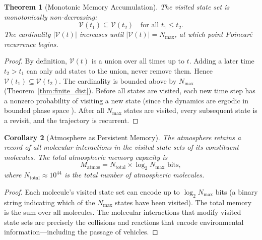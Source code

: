 \documentclass[11pt,twocolumn,a4paper]{article}
\theoremstyle{plain}
\newtheorem{theorem}{Theorem}[section]
\newtheorem{corollary}[theorem]{Corollary}
\theoremstyle{definition}
\theoremstyle{remark}
\newcommand{\Nmax}{N_{\mathrm{max}}}
\begin{document}
\begin{theorem}[Monotonic Memory Accumulation]
\label{thm:memory}
The visited state set is monotonically non-decreasing:
\begin{equation}
\mathcal{V}(t_1) \subseteq \mathcal{V}(t_2) \quad \text{for all } t_1 \leq t_2.
\label{eq:monotone}
\end{equation}
The cardinality $|\mathcal{V}(t)|$ increases until $|\mathcal{V}(t)| = \Nmax$, at which point Poincar\'e recurrence begins.
\end{theorem}

\begin{proof}
By definition, $\mathcal{V}(t)$ is a union over all times up to $t$. Adding a later time $t_2 > t_1$ can only add states to the union, never remove them. Hence $\mathcal{V}(t_1) \subseteq \mathcal{V}(t_2)$. The cardinality is bounded above by $\Nmax$ (Theorem~\ref{thm:finite_dist}). Before all states are visited, each new time step has a nonzero probability of visiting a new state (since the dynamics are ergodic in bounded phase space \cite{walters1982introduction}). After all $\Nmax$ states are visited, every subsequent state is a revisit, and the trajectory is recurrent.
\end{proof}

\begin{corollary}[Atmosphere as Persistent Memory]
\label{cor:atmos_memory}
The atmosphere retains a record of all molecular interactions in the visited state sets of its constituent molecules. The total atmospheric memory capacity is
\begin{equation}
M_{\mathrm{atmos}} = N_{\mathrm{total}} \times \log_2 \Nmax \text{ bits},
\label{eq:atmos_memory}
\end{equation}
where $N_{\mathrm{total}} \approx 10^{44}$ is the total number of atmospheric molecules.
\end{corollary}

\begin{proof}
Each molecule's visited state set can encode up to $\log_2 \Nmax$ bits (a binary string indicating which of the $\Nmax$ states have been visited). The total memory is the sum over all molecules. The molecular interactions that modify visited state sets are precisely the collisions and reactions that encode environmental information---including the passage of vehicles.
\end{proof}



\end{document}

